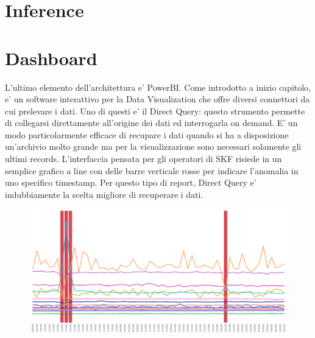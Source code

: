 \section{Inference}

\section{Dashboard}
L'ultimo elemento dell'architettura e' PowerBI. Come introdotto a inizio capitolo, e' un software interattivo per la Data Visualization che offre diversi connettori da cui prelevare i dati. Uno di questi e' il Direct Query: questo strumento permette di collegarsi direttamente all'origine dei dati ed interrogarla on demand. E' un modo particolarmente efficace di recupare i dati quando si ha a disposizione un'archivio molto grande ma per la visualizzazione sono necessari solamente gli ultimi records. 
L'interfaccia pensata per gli operatori di SKF risiede in un semplice grafico a line con delle barre verticale rosse per indicare l'anomalia in uno specifico timestamp. Per questo tipo di report, Direct Query e' indubbiamente la scelta migliore di recuperare i dati.  


\begin{figure}[t]
\includegraphics[width=14cm, scale=1]{images/powerbi}
\centering
\end{figure}


